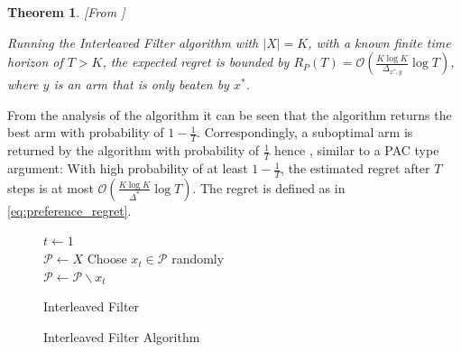 \documentclass[MSc,beforeExam]{iitcsthesis}
\newtheorem{theorem}{Theorem}
\begin{document}
	\begin{theorem}\label{thm:IF}[From \cite{yue2012k}]

		Running the Interleaved Filter algorithm with $|X|=K$, with a known finite time horizon of $T>K$, the expected regret is bounded by $R_P(T) = \mathcal{O} \left( \frac{K\log K}{\Delta_{x^*,y}} \log T \right)$, where $y$ is an arm that is only beaten by $x^*$.

	\end{theorem}
	From the analysis of the algorithm it can be seen that the algorithm returns the best arm with probability of $1-\frac{1}{T}$.
	Correspondingly, a suboptimal arm is returned by the algorithm with probability of $\frac{1}{T}$ hence , similar to a PAC type argument: With high probability of at least $1-\frac{1}{T}$, the estimated regret after $T$ steps is at most $\mathcal{O} \left( \frac{K\log K}{\Delta^*} \log T \right)$. The regret is defined as in \eqref{eq:preference_regret}.
	
	\begin{figure}[h]
	\IncMargin{1em}
		\begin{algorithm}[H]
		
			$ t\leftarrow 1$\\
			$ \mathcal{P} \leftarrow X$
			Choose $x_t \in \mathcal{P}$ randomly\\
			$ \mathcal{P} \leftarrow \mathcal{P} \backslash x_t$\\
			\BlankLine
			\caption{Interleaved Filter}
		\end{algorithm}
		\caption{Interleaved Filter Algorithm}\label{algo_IF}
	\end{figure}
	
\end{document}
